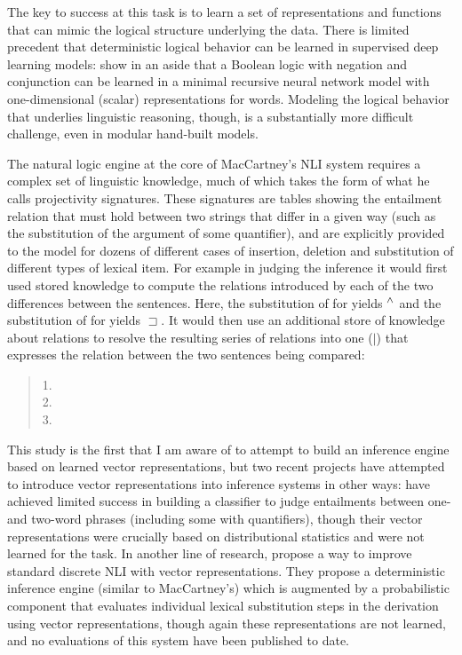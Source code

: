 The key to success at this task is to learn a set of representations and functions that can mimic the logical structure underlying the data. There is limited precedent that deterministic logical behavior can be learned in supervised deep learning models: \citet{socher2012semantic} show in an aside that a Boolean logic with negation and conjunction can be learned in a minimal recursive neural network model with one-dimensional (scalar) representations for words. Modeling the logical behavior that underlies linguistic reasoning, though, is a substantially more difficult challenge, even in modular hand-built models.

The natural logic engine at the core of MacCartney's \cite{maccartney2009natural} NLI system requires a complex set of linguistic knowledge, much of which takes the form of what he calls projectivity signatures. These signatures are tables showing the entailment relation that must hold between two strings that differ in a given way (such as the substitution of the argument of some quantifier), and are explicitly provided to the model
for dozens of different cases of insertion, deletion and substitution of different types of lexical item. For example in judging the inference  it would first used stored knowledge to compute the relations introduced by each of the two differences between the sentences. Here, the substitution of  for   yields $\mathbin{^{\wedge}}$ and the substitution of  for  yields $\sqsupset$. It would then use an additional store of knowledge about relations to resolve the resulting series of relations into one ($|$) that expresses the relation between the two sentences being compared:
\begin{quote}

1. \\
2. \\
3. 

\end{quote}

This study is the first that I am aware of to attempt to build an inference engine based on learned vector representations, but two recent projects have attempted to introduce vector representations into inference systems in other ways: 
\citet{baroni2012entailment} have achieved limited success in building a classifier to judge entailments between one- and two-word phrases (including some with quantifiers), though their vector representations were crucially based on distributional statistics and were not  learned for the task.
In another line of research, \citet{garrette2013formal} propose a way to improve standard discrete NLI with vector representations. They propose a deterministic inference engine (similar to MacCartney's) which is augmented by a probabilistic component that evaluates individual lexical substitution steps in the derivation using vector representations, though again these representations are not learned, and no evaluations of this system have been published to date.
\label{sec2}
